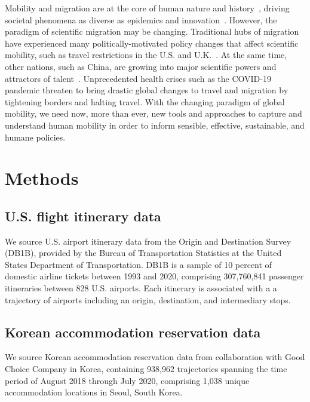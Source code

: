 \documentclass[12pt]{article} %
\begin{document}
Mobility and migration are at the core of human nature and history~\autocite{shah2020migration}, driving societal phenomena as diverse as epidemics\autocite{kraemer2020covid, truscott2012epidemicgravity, xia2005measlesgravity} and innovation~\autocite{kaiser2018innovation, armano2017innovation, sugimoto2017mostimpact, petersen2018multiscale, franzoni2014advantage, morgan2018prestige, rodrigues2016mobility}.
However, the paradigm of scientific migration may be changing.
Traditional hubs of migration have experienced many politically-motivated policy changes that affect scientific mobility, such as travel restrictions in the U.S. and U.K.~\autocite{chinchilla2018travelban}.
At the same time, other nations, such as China, are growing into major scientific powers and attractors of talent~\autocite{tollefson2018china, cao2020returning}.
Unprecedented health crises such as the COVID-19 pandemic threaten to bring drastic global changes to travel and migration by tightening borders and halting travel.
With the changing paradigm of global mobility, we need now, more than ever, new tools and approaches to capture and understand human mobility in order to inform sensible, effective, sustainable, and humane policies.


%
%
\section*{Methods}
\label{sec:datamethods} %

\subsection*{U.S. flight itinerary data}
We source U.S. airport itinerary data from the Origin and Destination Survey (DB1B), provided by the Bureau of Transportation Statistics at the United States Department of Transportation. 
DB1B is a sample of 10 percent of domestic airline tickets between 1993 and 2020, comprising 307,760,841 passenger itineraries between 828 U.S. airports. 
Each itinerary is associated with a a trajectory of airports including an origin, destination, and intermediary stops. 

\subsection*{Korean accommodation reservation data}
We source Korean accommodation reservation data from collaboration with Good Choice Company in Korea, containing 938,962 trajectories spanning the time period of August 2018 through July 2020,  comprising 1,038 unique accommodation locations in Seoul, South Korea. 
\end{document}
